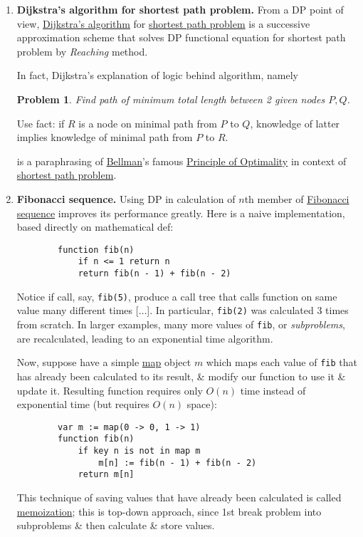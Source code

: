 \documentclass{article}
\newtheorem{problem}{Problem}
\begin{document}
\begin{enumerate}
	\item {\bf Dijkstra's algorithm for shortest path problem.} From a DP point of view, \href{https://en.wikipedia.org/wiki/Dijkstra%27s_algorithm}{Dijkstra's algorithm} for \href{https://en.wikipedia.org/wiki/Shortest_path_problem}{shortest path problem} is a successive approximation scheme that solves DP functional equation for shortest path problem by {\it Reaching} method.

	In fact, Dijkstra's explanation of logic behind algorithm, namely
	\begin{problem}
		Find path of minimum total length between 2 given nodes $P,Q$.
	\end{problem}
	Use fact: if $R$ is a node on minimal path from $P$ to $Q$, knowledge of latter implies knowledge of minimal path from $P$ to $R$.

	is a paraphrasing of \href{https://en.wikipedia.org/wiki/Richard_Bellman}{\sc Bellman}'s famous \href{https://en.wikipedia.org/wiki/Principle_of_Optimality}{Principle of Optimality} in context of \href{https://en.wikipedia.org/wiki/Shortest_path_problem}{shortest path problem}.
	\item {\bf Fibonacci sequence.} Using DP in calculation of $n$th member of \href{https://en.wikipedia.org/wiki/Fibonacci_sequence}{Fibonacci sequence} improves its performance greatly. Here is a naive implementation, based directly on mathematical def:
	\begin{verbatim}
		function fib(n)
		    if n <= 1 return n
		    return fib(n - 1) + fib(n - 2)
	\end{verbatim}
	Notice if call, say, {\tt fib(5)}, produce a call tree that calls function on same value many different times [$\ldots$]. In particular, {\tt fib(2)} was calculated 3 times from scratch. In larger examples, many more values of {\tt fib}, or {\it subproblems}, are recalculated, leading to an exponential time algorithm.

	Now, suppose have a simple \href{https://en.wikipedia.org/wiki/Associative_array}{map} object $m$ which maps each value of {\tt fib} that has already been calculated to its result, \& modify our function to use it \& update it. Resulting function requires only $O(n)$ time instead of exponential time (but requires $O(n)$ space):
	\begin{verbatim}
		var m := map(0 -> 0, 1 -> 1)
		function fib(n)
		    if key n is not in map m
		        m[n] := fib(n - 1) + fib(n - 2)
		    return m[n]
	\end{verbatim}
	This technique of saving values that have already been calculated is called \href{https://en.wikipedia.org/wiki/Memoization}{memoization}; this is top-down approach, since 1st break problem into subproblems \& then calculate \& store values.


\end{enumerate}
\end{document}
